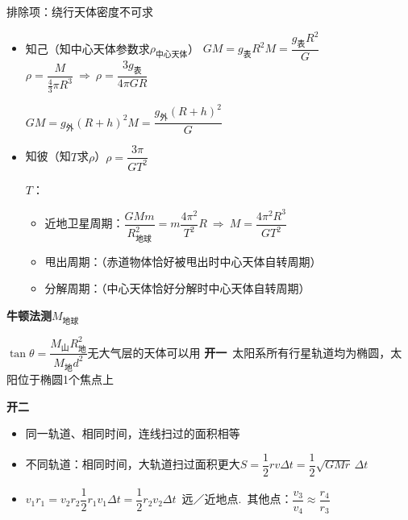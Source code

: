 
排除项：绕行天体密度不可求

\begin{itemize}
\item 知己（知中心天体参数求$\rho_{\text{中心天体}}$）\quad
$GM=g_{\text{表}}R^{2}$\quad $M=\dfrac{g_{\text{表}}R^{2}}{G}$\quad $\rho=\dfrac{M}{\frac{4}{3}\pi R^{3}}\ \Rightarrow\ \rho=\dfrac{3g_{\text{表}}}{4\pi GR}$

\quad $GM=g_{\text{外}}(R+h)^{2}$\quad $M=\dfrac{g_{\text{外}}(R+h)^{2}}{G}$%
\item 知彼（知$T$求$\rho$）\quad $\rho=\dfrac{3\pi}{GT^{2}}$\quad {}\quad {}

$T$：
\begin{itemize}
\item 近地卫星周期：$\dfrac{GMm}{R_{\text{地球}}^{2}}=m\dfrac{4\pi^{2}}{T^{2}}R\ \Rightarrow\ M=\dfrac{4\pi^{2}R^{3}}{GT^{2}}$%
\item 甩出周期：（赤道物体恰好被甩出时中心天体自转周期）
\item 分解周期：（中心天体恰好分解时中心天体自转周期）
\end{itemize}
\end{itemize}
\textbf{牛顿法测$M_{\text{地球}}$}


$\tan\theta=\dfrac{M_{\text{山}}R_{\text{地}}^{2}}{M_{\text{地}}d^{2}}$\qquad 无大气层的天体可以用
\textbf{开一}\ 太阳系所有行星轨道均为椭圆，太阳位于椭圆1个焦点上%

\textbf{开二}
\begin{itemize}
\item 同一轨道、相同时间，连线扫过的面积相等
\item 不同轨道：相同时间，大轨道扫过面积更大\quad $S=\dfrac{1}{2}rv\Delta t=\dfrac{1}{2}\sqrt{GMr}\,\Delta t$
\item $v_1r_1=v_2r_2$\quad $\dfrac{1}{2}r_1v_1\Delta t=\dfrac{1}{2}r_2v_2\Delta t$\ 远／近地点.\ 其他点：$\dfrac{v_3}{v_4}\approx\dfrac{r_4}{r_3}$
\end{itemize}


